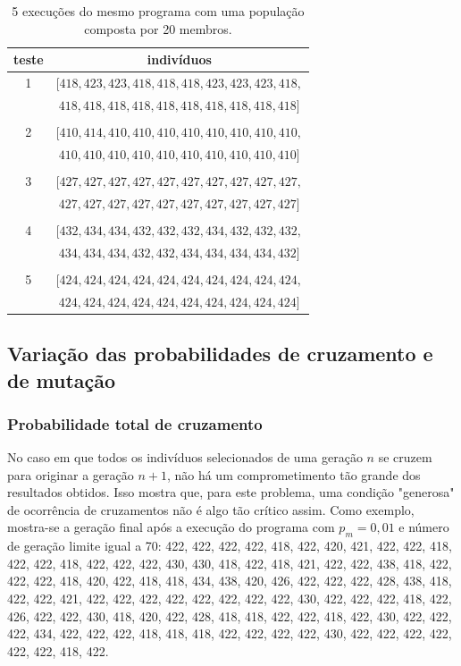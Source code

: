 \documentclass[11pt]{article}
\begin{document}
\begin{table}[h]
\centering
\begin{tabular}{cc}
 teste & indivíduos \\ 
 \midrule 
 1 & $[418, 423, 423, 418, 418, 418, 423, 423, 423, 418, $\\
   & $418, 418, 418, 418, 418, 418, 418, 418, 418, 418]$ \\
   & \\
 2 & $[410, 414, 410, 410, 410, 410, 410, 410, 410, 410, $\\
   & $410, 410, 410, 410, 410, 410, 410, 410, 410, 410]$ \\
   & \\
 3 & $[427, 427, 427, 427, 427, 427, 427, 427, 427, 427, $ \\
   & $427, 427, 427, 427, 427, 427, 427, 427, 427, 427]$ \\
   & \\
 4 & $[432, 434, 434, 432, 432, 432, 434, 432, 432, 432, $ \\
   & $434, 434, 434, 432, 432, 434, 434, 434, 434, 432]$ \\
   & \\
 5 & $[424, 424, 424, 424, 424, 424, 424, 424, 424, 424, $ \\
   & $424, 424, 424, 424, 424, 424, 424, 424, 424, 424]$ \\
 \bottomrule
\end{tabular}\caption{5 execuções do mesmo programa com uma população composta por 20 membros.}
\end{table}

\subsection{Variação das probabilidades de cruzamento e de mutação}

\subsubsection{Probabilidade total de cruzamento}

No caso em que todos os indivíduos selecionados de uma geração $n$ se cruzem para originar a geração $n+1$, não há um comprometimento tão grande dos resultados obtidos. Isso mostra que, para este problema, uma condição "generosa" de ocorrência de cruzamentos não é algo tão crítico assim. Como exemplo, mostra-se a geração final após a execução do programa com $p_m = 0,01$ e número de geração limite igual a 70: 422, 422, 422, 422, 418, 422, 420, 421, 422, 422, 418, 422, 422, 418, 422, 422, 422, 430, 430, 418, 422, 418, 421, 422, 422, 438, 418, 422, 422, 422, 418, 420, 422, 418, 418, 434, 438, 420, 426, 422, 422, 422, 428, 438, 418, 422, 422, 421, 422, 422, 422, 422, 422, 422, 422, 422, 430, 422, 422, 422, 418, 422, 426, 422, 422, 430, 418, 420, 422, 428, 418, 418, 422, 422, 418, 422, 430, 422, 422, 422, 434, 422, 422, 422, 418, 418, 418, 422, 422, 422, 422, 430, 422, 422, 422, 422, 422, 422, 418, 422.
\end{document}
